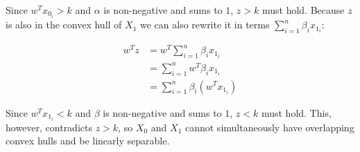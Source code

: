 \documentclass[12pt]{article}
\begin{document}
	Since $w^Tx_{0_i} > k$ and $\alpha$ is non-negative and sums to $1$, $z > k$ must hold. Because $z$ is also in the convex hull of $X_1$ we can also rewrite it in terms $\sum_{i=1}^n\beta_ix_{1_i}$:
	
	\begin{align}
		w^Tz &= w^T\sum_{i=1}^n\beta_ix_{1_i} \\
		&= \sum_{i=1}^nw^T\beta_ix_{1_i} \\
		&= \sum_{i=1}^n\beta_i\left(w^Tx_{1_i}\right)
	\end{align}
	
	Since $w^Tx_{1_i} < k$ and $\beta$ is non-negative and sums to $1$, $z < k$ must hold. This, however, contradicts $z > k$, so $X_0$ and $X_1$ cannot simultaneously have overlapping convex hulls and be linearly separable.
\end{document}
